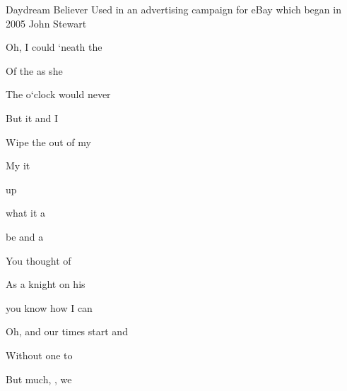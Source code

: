 \begin{SBSong}{Daydream Believer}
  {Used in an advertising campaign for eBay which began in 2005}
  {John Stewart}
  \begin{SBVerse}
    Oh, I could  `neath the 
    
    Of the  as she 
    
    The  o`clock  would never  
    
    But it  and I 
    
    Wipe the  out of my 
    
    My     it 
  \end{SBVerse}
  \begin{SBChorus}
     up  
    
     what  it   a
    
     be and a
       
       
  \end{SBChorus}
  \begin{SBVerse}
    You  thought of 
    
    As a  knight on his 
    
     you know how  I can  
    
    Oh, and our  times start and 
    
    Without  one to 
    
    But  much, ,  we  
  \end{SBVerse}
\end{SBSong}
